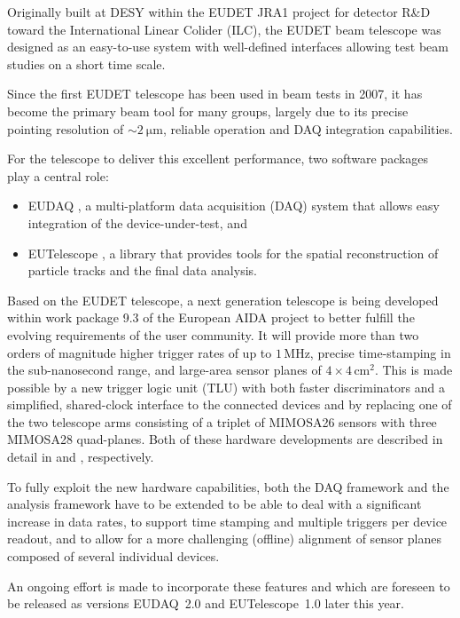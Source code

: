 \documentclass[paper=a4, fontsize=11pt, titlepage]{scrartcl}	%
\newcommand{\unit}[1]{\, \mathrm{#1}} %
\numberwithin{equation}{section}		%
\numberwithin{figure}{section}			%
\numberwithin{table}{section}           	%
\begin{document}
  Originally built at DESY within the EUDET JRA1 project for detector
  R\&D toward the International Linear Colider (ILC), the EUDET beam
  telescope \cite{beamtelescopesportal} was designed as an easy-to-use system with
  well-defined interfaces allowing test beam studies on a short time
  scale.

  Since the first EUDET telescope has been used in beam tests
  in 2007, it has become the primary beam tool for many groups,
  largely due to its precise pointing resolution of $\sim
  \SI{2}{\micro\meter}$, reliable operation and DAQ integration
  capabilities.

  For the telescope to deliver this excellent performance, two
  software packages play a central role:

  \begin{itemize}
  \item EUDAQ \cite{eudaqsite}, a multi-platform data acquisition
    (DAQ) system that allows
    easy integration of the device-under-test, and
  \item EUTelescope \cite{eutelsite}, a library that provides tools for the spatial
    reconstruction of particle tracks and the final data analysis.
  \end{itemize}

  Based on the EUDET telescope, a next generation telescope is being
  developed within work package 9.3 of the European AIDA project to
  better fulfill the evolving requirements of the user community. It
  will provide more than two orders of magnitude higher trigger rates
  of up to $1\unit{MHz}$, {precise time-stamping} in the
  sub-nanosecond range, and {large-area sensor planes} of
  $4\times4\unit{cm^2}$. This is made possible by a new trigger logic
  unit (TLU) with both faster discriminators and a simplified,
  shared-clock interface to the connected devices and by replacing one
  of the two telescope arms consisting of a triplet of MIMOSA26
  sensors with three MIMOSA28 quad-planes. Both of these hardware
  developments are described in detail in \cite{tlu2014} and
  \cite{tlu2014}, respectively.

  To fully exploit the new hardware capabilities, both the DAQ
  framework and the analysis framework have to be extended to be able
  to deal with a significant increase in data rates, to support time
  stamping and multiple triggers per device readout, and to allow for
  a more challenging (offline) alignment of sensor planes composed of
  several individual devices.

  An ongoing effort is made to incorporate these features and which
  are foreseen to be released as versions EUDAQ~2.0 and
  EUTelescope~1.0 later this year.
\end{document}
